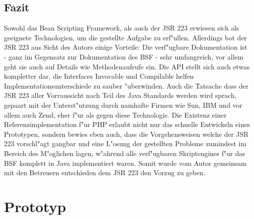\subsection{Fazit}
\label{sec:chap1:ana:fazit}

Sowohl das Bean Scripting Framework, als auch der JSR 223 erwiesen sich als geeignete Technologien, um die gestellte Aufgabe zu 
erf"ullen. Allerdings bot der JSR 223 aus Sicht des Autors einige Vorteile: 
Die verf"ugbare Dokumentation ist - ganz im Gegensatz zur Dokumentation des BSF - sehr umfangreich, vor allem geht sie auch
auf Details wie Methodenaufrufe ein. Die API stellt sich auch etwas kompletter dar, die Interfaces Invocable und Compilable 
helfen Implementationsunterschiede zu sauber "uberwinden. Auch die Tatsache dass der JSR 223 aller Vorraussicht nach Teil
des Java Standards werden wird sprach, gepaart mit der Unterst"utzung durch namhafte Firmen wie Sun, IBM und vor allem auch 
Zend, eher f"ur als gegen diese Technologie. Die Existenz einer Referenzimplementation f"ur PHP erlaubt nicht nur das
schnelle Entwickeln eines Prototypen, sondern bewies eben auch, dass die Vorgehensweisen welche der JSR 223 vorschl"agt 
gangbar und eine L"osung der gestellten Probleme zumindest im Bereich des M"oglichen lagen, w"ahrend alle verf"ugbaren
Skriptengines f"ur das BSF komplett in Java implementiert waren.
Somit wurde vom Autor gemeinsam mit den Betreuern entschieden dem JSR 223 den Vorzug zu geben.

\section{Prototyp}
\label{sec:chap1:prototype}

